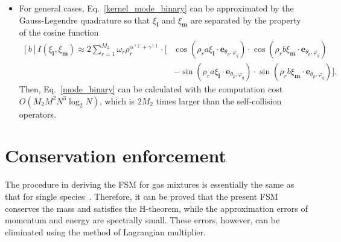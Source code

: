 \begin{itemize}
    \item {For general cases, Eq.~\eqref{kernel_mode_binary} can be approximated by the Gauss-Legendre quadrature so that $\xi_\textbf{l}$ and $\xi_\textbf{m}$ are separated by the property of the cosine function        \begin{equation}\label{phi_expression3}
            \begin{aligned}[b]
                        I(\xi_\textbf{l},\xi_\textbf{m})\approx2
        \sum_{r=1}^{M_2}\omega_r\rho_r^{\alpha^{\imath\jmath}+\gamma^{\imath\jmath}}
                \cdot[&\cos(\rho_r{}a\xi_\textbf{l}\cdot{\textbf{e}}_{\theta_p,\varphi_q})\cdot
                       \cos(\rho_r{}b\xi_\textbf{m}\cdot{\textbf{e}}_{\theta_p,\varphi_q})\\
                     &-\sin(\rho_r{}a\xi_\textbf{l}\cdot{\textbf{e}}_{\theta_p,\varphi_q})\cdot
                       \sin(\rho_r{}b\xi_\textbf{m}\cdot{\textbf{e}}_{\theta_p,\varphi_q})].
        \end{aligned}
        \end{equation}
         Then, Eq.~\eqref{mode_binary} can be calculated with the computation cost $O(M_2M^2N^3\log_2N)$, which is $2M_2$ times larger than the self-collision operators.}
\end{itemize}


\section{Conservation enforcement}


The procedure in deriving the FSM for gas mixtures is essentially the same as that for single species~\cite{Mouhot2006}. Therefore, it can be proved that the present FSM conserves the mass and satisfies the H-theorem, while the approximation errors of momentum and energy are spectrally small. These errors, however, can be eliminated using the method of Lagrangian multiplier.


